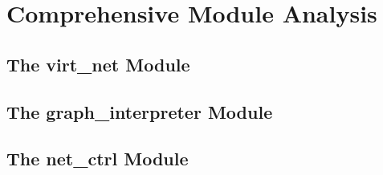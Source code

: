 \chapter{Comprehensive Module Analysis}
    \section{The virt\_net Module} \label{sec:virt-net-module}
        
        
        
        
        
        
        
        

    \section{The graph\_interpreter Module} \label{sec:graph-interpreter-module}
        

    \section{The net\_ctrl Module} \label{sec:net-ctrl-module}
        
